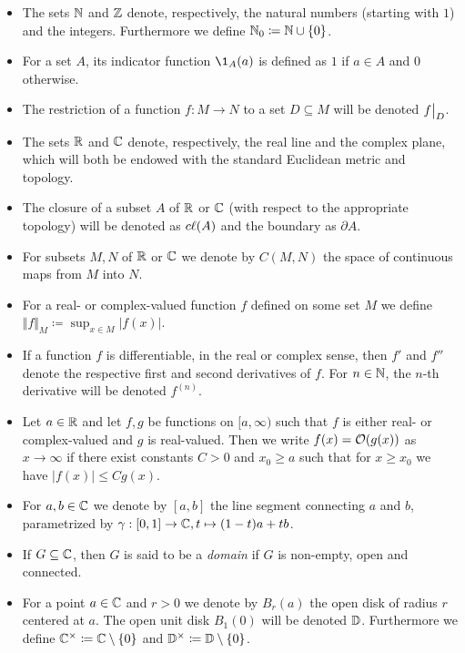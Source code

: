 \begin{itemize}[label=$\rightsquigarrow$]
    \item The sets $\mathbb{N}$ and $\mathbb{Z}$ denote, respectively, the natural numbers (starting with $1$) and the integers. Furthermore we define $\mathbb{N}_0 \coloneqq \mathbb{N} \cup \{ 0 \}$.
    \item For a set $A$, its indicator function $\1_A(a)$ is defined as $1$ if $a \in A$ and $0$ otherwise.
    \item The restriction of a function $f : M \to N$ to a set $D \subseteq M$ will be denoted $\restr{f}{D}$.
    \item The sets $\mathbb{R}$ and $\mathbb{C}$ denote, respectively, the real line and the complex plane, which will both be endowed with the standard Euclidean metric and topology.
    \item The closure of a subset $A$ of $\mathbb{R}$ or $\mathbb{C}$ (with respect to the appropriate topology) will be denoted as $c\ell({A})$ and the boundary as $\partial A$.
    \item For subsets $M, N$ of $\mathbb{R}$ or $\mathbb{C}$ we denote by $C(M, N)$ the space of continuous maps from $M$ into $N$.
    \item For a real- or complex-valued function $f$ defined on some set $M$ we define $\Vert f \Vert_M \coloneqq \sup_{x \in M} \vert f(x) \vert$.
    \item If a function $f$ is differentiable, in the real or complex sense, then $f'$ and $f''$ denote the respective first and second derivatives of $f$. For $n \in \mathbb{N}$, the $n$-th derivative will be denoted $f^{(n)}$.
    \item Let $a \in \mathbb{R}$ and let $f, g$ be functions on $[a, \infty)$ such that $f$ is either real- or complex-valued and $g$ is real-valued. Then we write $f(x) = \mathcal{O}(g(x))$ as $x \to \infty$ if there exist constants $C > 0$ and $x_0 \geq a$ such that for $x \geq x_0$ we have $\vert f(x) \vert \leq C g(x)$.
    \item For $a, b \in \mathbb{C}$ we denote by $[a, b]$ the line segment connecting $a$ and $b$, parametrized by $\gamma : [0, 1] \to \mathbb{C}, t \mapsto (1 - t) a + tb$.
    \item If $G \subseteq \mathbb{C}$, then $G$ is said to be a \emph{domain} if $G$ is non-empty, open and connected.
    \item For a point $a \in \mathbb{C}$ and $r > 0$ we denote by $B_r(a)$ the open disk of radius $r$ centered at $a$. The open unit disk $B_1(0)$ will be denoted $\mathbb{D}$. Furthermore we define $\mathbb{C}^\times \coloneqq \mathbb{C} \setminus \{ 0 \}$ and $\mathbb{D}^\times \coloneqq \mathbb{D} \setminus \{ 0 \}$.

\end{itemize}
